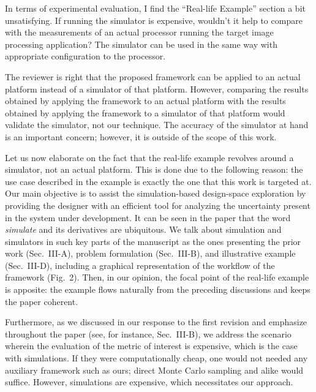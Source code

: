 \begin{reviewer}
In terms of experimental evaluation, I find the ``Real-life Example'' section a
bit unsatisfying. If running the simulator is expensive, wouldn't it help to
compare with the measurements of an actual processor running the target image
processing application? The simulator can be used in the same way with
appropriate configuration to the processor.
\end{reviewer}

\begin{authors}
The reviewer is right that the proposed framework can be applied to an actual
platform instead of a simulator of that platform. However, comparing the results
obtained by applying the framework to an actual platform with the results
obtained by applying the framework to a simulator of that platform would
validate the simulator, not our technique. The accuracy of the simulator at hand
is an important concern; however, it is outside of the scope of this work.

Let us now elaborate on the fact that the real-life example revolves around a
simulator, not an actual platform. This is done due to the following reason: the
use case described in the example is exactly the one that this work is targeted
at. Our main objective is to assist the simulation-based design-space
exploration by providing the designer with an efficient tool for analyzing the
uncertainty present in the system under development. It can be seen in the paper
that the word \emph{simulate} and its derivatives are ubiquitous. We talk about
simulation and simulators in such key parts of the manuscript as the ones
presenting the prior work (Sec.~III-A), problem formulation (Sec.~III-B), and
illustrative example (Sec.~III-D), including a graphical representation of the
workflow of the framework (Fig.~2). Then, in our opinion, the focal point of the
real-life example is apposite: the example flows naturally from the preceding
discussions and keeps the paper coherent.

Furthermore, as we discussed in our response to the first revision and emphasize
throughout the paper (see, for instance, Sec.~III-B), we address the scenario
wherein the evaluation of the metric of interest is expensive, which is the case
with simulations. If they were computationally cheap, one would not needed any
auxiliary framework such as ours; direct Monte Carlo sampling and alike would
suffice. However, simulations are expensive, which necessitates our approach.
\end{authors}

